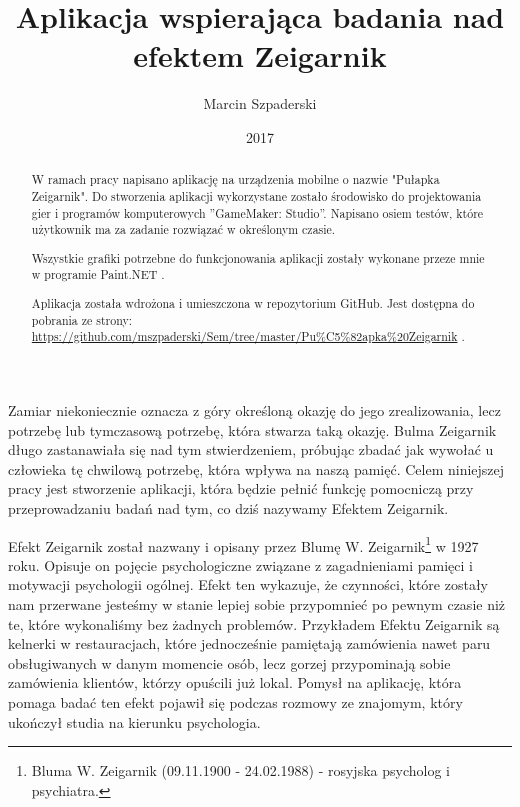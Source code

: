 \documentclass[openright]{xmgr}
\author   {Marcin Szpaderski}
\title    {Aplikacja wspierająca badania nad efektem Zeigarnik}
\date     {2017}
\begin{document}
\begin{abstract}
W ramach pracy napisano aplikację na urządzenia mobilne o nazwie "Pułapka Zeigarnik". Do stworzenia aplikacji wykorzystane zostało środowisko do projektowania gier i programów komputerowych ”GameMaker: Studio”. Napisano osiem testów, które użytkownik ma za zadanie rozwiązać w określonym czasie.

Wszystkie grafiki potrzebne do funkcjonowania aplikacji zostały wykonane przeze mnie w programie Paint.NET .

Aplikacja została wdrożona i umieszczona w repozytorium GitHub. Jest dostępna do pobrania ze strony: \url{ https://github.com/mszpaderski/Sem/tree/master/Pu\%C5\%82apka\%20Zeigarnik} .



\end{abstract}


\maketitle

\introduction

Zamiar niekoniecznie oznacza z góry określoną okazję do jego zrealizowania, lecz potrzebę lub tymczasową potrzebę, która stwarza taką okazję. Bulma Zeigarnik długo zastanawiała się nad tym stwierdzeniem, próbując zbadać jak wywołać u człowieka tę chwilową potrzebę, która wpływa na naszą pamięć. Celem niniejszej pracy jest stworzenie aplikacji, która będzie pełnić funkcję pomocniczą przy przeprowadzaniu badań nad tym, co dziś nazywamy Efektem Zeigarnik.

Efekt Zeigarnik został nazwany i opisany przez Blumę W. Zeigarnik\footnote{Bluma W. Zeigarnik (09.11.1900 - 24.02.1988) - rosyjska psycholog i psychiatra.} w 1927 roku. Opisuje on pojęcie psychologiczne związane z zagadnieniami pamięci i motywacji psychologii ogólnej. Efekt ten wykazuje, że czynności, które zostały nam przerwane jesteśmy w stanie lepiej sobie przypomnieć po pewnym czasie niż te, które wykonaliśmy bez żadnych problemów. Przykładem Efektu Zeigarnik są kelnerki w restauracjach, które jednocześnie pamiętają zamówienia nawet paru obsługiwanych w danym momencie osób, lecz gorzej przypominają sobie zamówienia klientów, którzy opuścili już lokal. Pomysł na aplikację, która pomaga badać ten efekt pojawił się podczas rozmowy ze znajomym, który ukończył studia na kierunku psychologia.
\end{document}
